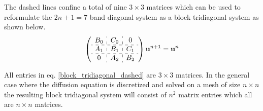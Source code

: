 \noindent The dashed lines confine a total of nine $3\times 3$ matrices which can be used to reformulate the $2n +1 = 7$ band diagonal system as a block tridiagonal system as shown below.
\begin{align}\label{block_tridiagonal_dashed}
 \left(\begin{array}{c : c : c }
        B_0 & C_0 &0  \\ \hdashline
        A_1 & B_1 & C_1 \\ \hdashline
        0& A_2 & B_2
       \end{array}\right)\mathbf{u}^{n+1} = \mathbf{u}^{n}
\end{align}

\noindent All entries in eq. \eqref{block_tridiagonal_dashed} are $3\times3$ matrices. 
In the general case where the diffusion equation is discretized and solved on a mesh of size $n\times n$ the resulting block tridiagonal system will consist of $n^2$ matrix entries which all are $n\times n$ matrices.
% 
% 

